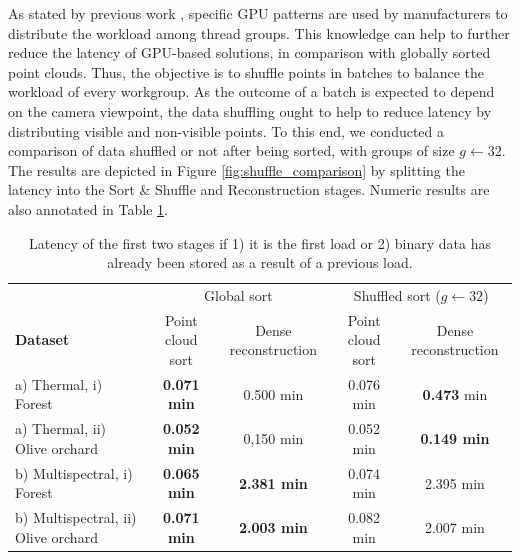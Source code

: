 As stated by previous work \cite{schutz_rendering_2021, kerbl_effective_2017}, specific GPU patterns are used by manufacturers to distribute the workload among thread groups. This knowledge can help to further reduce the latency of GPU-based solutions, in comparison with globally sorted point clouds. Thus, the objective is to shuffle points in batches to balance the workload of every workgroup. As the outcome of a batch is expected to depend on the camera viewpoint, the data shuffling ought to help to reduce latency by distributing visible and non-visible points. To this end, we conducted a comparison of data shuffled or not after being sorted, with groups of size $g \gets 32$. The results are depicted in Figure \ref{fig:shuffle_comparison} by splitting the latency into the Sort \& Shuffle and Reconstruction stages. Numeric results are also annotated in Table \ref{table:shuffling_results}.

\renewcommand{\arraystretch}{1.2}
\begin{table}
    \footnotesize
    \centering
    \caption{Latency of the first two stages if 1) it is the first load or 2) binary data has already been stored as a result of a previous load. }
    \label{table:shuffling_results}
    
    \begin{tabular}{l@{\hskip 0.15in}|cc|cc}
    \toprule
     & \multicolumn{2}{c}{Global sort} & \multicolumn{2}{c}{Shuffled sort ($g \gets 32$)}\\
    \cmidrule{1-5}
    \textbf{Dataset} & Point cloud sort & Dense reconstruction &  Point cloud sort & Dense reconstruction\\
    \cmidrule{1-5}
    a) Thermal, i) Forest & \textbf{0.071 \si{\minute}} & 0.500 \si{\minute}
    & 0.076 \si{\minute} & \textbf{0.473} \si{\minute}\\
    \cmidrule{1-5}
    a) Thermal, ii) Olive orchard & \textbf{0.052 \si{\minute}} & 0,150 \si{\minute}
    & 0.052 \si{\minute} & \textbf{0.149 \si{\minute}}\\
    \cmidrule{1-5}
    b) Multispectral, i) Forest & \textbf{0.065 \si{\minute}} & \textbf{2.381 \si{\minute}}
    & 0.074 \si{\minute} & 2.395 \si{\minute}\\
    \cmidrule{1-5}
    b) Multispectral, ii) Olive orchard & \textbf{0.071 \si{\minute}} & \textbf{2.003 \si{\minute}}
    & 0.082 \si{\minute} & 2.007 \si{\minute}\\
    \bottomrule
    \end{tabular}
\end{table}
\renewcommand{\arraystretch}{1}

